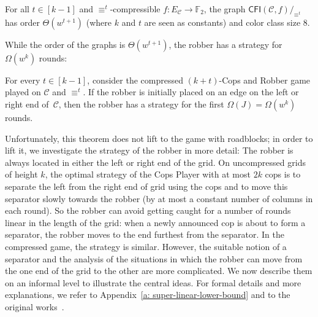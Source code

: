 \documentclass[a4paper,english, thm-restate]{lipics-v2021}
\newcommand{\comp}{\equiv}
\newcommand{\CFIsym}{\mathsf{CFI}}
\newcommand{\CFI}[1]{\CFIsym(#1)}
\newcommand{\compCFI}[2]{\CFI{#1}/_{#2}}
\newcommand{\FF}{\mathbb{F}}
\newcommand{\grid}{\mathcal{C}}
\newcommand{\edgeC}{E_{\mathcal{C}}}
\newcommand{\confORfull}[2]{#1}
\newcommand{\ifAppendix}[1]{#1}
\begin{document}
\begin{lemma}
        \label{lem:compression-size}
        For all $t \in [k-1]$ and $\comp^t$-compressible $f \colon \edgeC \to \FF_2$,
        the graph $\compCFI{\grid,f}{\comp^t}$ has order $\Theta(w^{t+1})$
        (where $k$ and $t$ are seen as constants) and color class size $8$.
\end{lemma}
\confORfull{}{
        \begin{proof}
                Let $t \in [k-1]$ and $i\in[k]$.
                In the $i$-th row, there are $f(k)p_i \cdot \ldots \cdot p_{i+t} + 2f(k) = \Theta(w^{t+1})$
                equivalence classes.
                Since only vertices in the same row are $\comp^t$-equivalence,
                there are $\Theta(w^{t+1})$ equivalence classes in total.
                Since all vertices in the cylindrical grid $\grid$ have degree at most $4$,
                for every $\comp^t$-equivalence class there are at most $8$ vertices added
                to $\compCFI{\grid,f}{\comp^t}$ (namely one CFI gadget of degree at most $4$).
                Hence, $\compCFI{\grid,f}{\comp^t}$ has order $\Theta(w^{t+1})$.
\end{proof}
}

\noindent While the order of the graphs is $\Theta(w^{t+1})$,
the robber has a strategy for  $\Omega(w^k)$ rounds:

\begin{theorem}
        \label{thm:compressed-lower-bound}
        For every $t \in [k-1]$, consider the compressed $(k+t)$-Cops and Robber game
        played on $\grid$ and $\comp^t$.
        If the robber is initially placed on an edge on the left or right end of~$\grid$,
        then the robber has a strategy for the first $\Omega(J)=\Omega(w^k)$ rounds.
\end{theorem}

\noindent Unfortunately, this theorem does not lift to the game with roadblocks; in order to lift it, we investigate the strategy of the robber in more detail: The robber is always located in either  the left or right end of the grid.
On uncompressed grids of height $k$, the optimal strategy of the Cops Player with at most $2k$ cops is to separate the left from the right end of grid using the cops and to move this separator slowly towards the robber (by at most a constant number of columns in each round).
So the robber can avoid getting caught for a number of rounds linear in the length of the grid: when a newly announced cop is about to form a separator, the robber moves to the end furthest from the separator.
In the compressed game, the strategy is similar.
However, the suitable notion of a separator and the analysis of the situations in which the robber can move from the one end of the grid to the other are more complicated.
We now describe them on an informal level to illustrate the central ideas.
For formal details and more explanations, we refer to \ifAppendix{Appendix~\ref{a: super-linear-lower-bound} and to }the original works~\cite{RFJN024,DBLP:conf/focs/GroheLNS23}.
\end{document}
